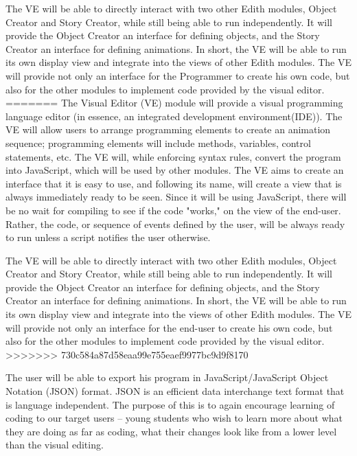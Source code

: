 \documentclass[a4paper, 10pt, oneside]{article}
\begin{document}
\begin{usecase}
{\indent The VE will be able to directly interact with two other Edith modules, Object Creator and Story Creator, while still being able to run independently.  It will provide the Object Creator an interface for defining objects, and the Story Creator an interface for defining animations.  In short, the VE will be able to run its own display view and integrate into the views of other Edith modules. The VE will provide not only an interface for the Programmer to create his own code, but also for the other modules to implement code provided by the visual editor.\newline	
=======
\indent The Visual Editor (VE) module will provide a visual programming language editor (in essence, an integrated development environment(IDE)).  The VE will allow users to arrange programming elements to create an animation sequence; programming elements will include methods, variables, control statements, etc. The VE will, while enforcing syntax rules, convert the program into JavaScript, which will be used by other modules. The VE aims to create an interface that it is easy to use, and following its name, will create a view that is always immediately ready to be seen. Since it will be using JavaScript, there will be no wait for compiling to see if the code "works," on the view of the end-user. Rather, the code, or sequence of events defined by the user, will be always ready to run unless a script notifies the user otherwise.\newline

\indent The VE will be able to directly interact with two other Edith modules, Object Creator and Story Creator, while still being able to run independently.  It will provide the Object Creator an interface for defining objects, and the Story Creator an interface for defining animations.  In short, the VE will be able to run its own display view and integrate into the views of other Edith modules. The VE will provide not only an interface for the end-user to create his own code, but also for the other modules to implement code provided by the visual editor.\newline	
>>>>>>> 730c584a87d58eaa99e755eaef9977bc9d9f8170

\indent The user will be able to export his program in JavaScript/JavaScript Object Notation (JSON) format. JSON is an efficient data interchange text format that is language independent. The purpose of this is to again encourage learning of coding to our target users -- young students who wish to learn more about what they are doing as far as coding, what their changes look like from a lower level than the visual editing.\newline
}

\end{usecase}
\end{document}
